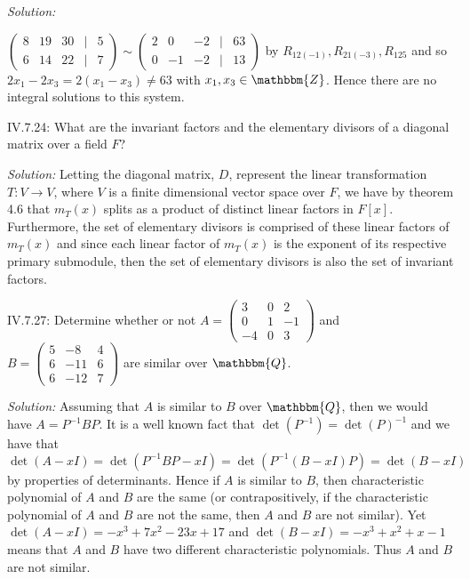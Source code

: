 \documentclass{letter}
\newcommand{\tmem}[1]{{\em #1\/}}
\begin{document}
{\tmem{Solution:}}

$\left(\begin{array}{ccccc}
  8 & 19 & 30 & | & 5\\
  6 & 14 & 22 & | & 7
\end{array}\right) \sim \left(\begin{array}{ccccc}
  2 & 0 & - 2 & | & 63\\
  0 & - 1 & - 2 & | & 13
\end{array}\right)$ by $R_{12 (- 1)}, R_{21 (- 3)}, R_{125}$ and so $2 x_1 - 2
x_3 = 2 (x_1 - x_3) \neq 63$ with $x_1, x_3 \in \mathbbm{Z}$. Hence there are
no integral solutions to this system.

IV.7.24: What are the invariant factors and the elementary divisors of a
diagonal matrix over a field $F$?

{\tmem{Solution:}} Letting the diagonal matrix, $D$, represent the linear
transformation $T : V \rightarrow V$, where $V$ is a finite dimensional vector
space over $F$, we have by theorem 4.6 that $m_T (x)$ splits as a product of
distinct linear factors in $F [x]$. Furthermore, the set of elementary
divisors is comprised of these linear factors of $m_T (x)$ and since each
linear factor of $m_T (x)$ is the exponent of its respective primary
submodule, then the set of elementary divisors is also the set of invariant
factors.

IV.7.27: Determine whether or not $A = \left(\begin{array}{ccc}
  3 & 0 & 2\\
  0 & 1 & - 1\\
  - 4 & 0 & 3
\end{array}\right)$ and $B = \left(\begin{array}{ccc}
  5 & - 8 & 4\\
  6 & - 11 & 6\\
  6 & - 12 & 7
\end{array}\right)$ are similar over $\mathbbm{Q}$.

{\tmem{Solution:}} Assuming that $A$ is similar to $B$ over $\mathbbm{Q}$,
then we would have $A = P^{- 1} B P$. It is a well known fact that $\det (P^{-
1}) = \det (P)^{- 1}$ and we have that $\det (A - x I) = \det (P^{- 1} B P - x
I) = \det (P^{- 1} (B - x I) P) = \det (B - x I)$ by properties of
determinants. Hence if $A$ is similar to $B$, then characteristic polynomial
of $A$ and $B$ are the same (or contrapositively, if the characteristic
polynomial of $A$ and $B$ are not the same, then $A$ and $B$ are not similar).
Yet $\det (A - x I) = - x^3 + 7 x^2 - 23 x + 17$ and $\det (B - x I) = - x^3 +
x^2 + x - 1$ means that $A$ and $B$ have two different characteristic
polynomials. Thus $A$ and $B$ are not similar.
\end{document}
